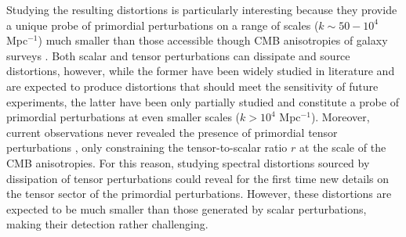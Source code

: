 Studying the resulting distortions is particularly interesting because they provide a unique probe of primordial perturbations on a range of scales ($k\sim50-10^{4}$ Mpc$^{-1}$) much smaller than those accessible though CMB anisotropies of galaxy surveys \cite{chlubafuturestepscosmologyusing}. Both scalar and tensor perturbations can dissipate and source distortions, however, while the former have been widely studied in literature \cite{Lucca_2020,Chluba_2x2} and are expected to produce distortions that should meet the sensitivity of future experiments, the latter have been only partially studied \cite{Chluba_tens_diss} and constitute a probe of primordial perturbations at even smaller scales ($k>10^{4}$ Mpc$^{-1}$). Moreover, current observations never revealed the presence of primordial tensor perturbations \cite{Ade_2021,planck2018results}, only constraining the tensor-to-scalar ratio $r$ at the scale of the CMB anisotropies. For this reason, studying spectral distortions sourced by dissipation of tensor perturbations could reveal for the first time new details on the tensor sector of the primordial perturbations. However, these distortions are expected to be much smaller than those generated by scalar perturbations, making their detection rather challenging. 

